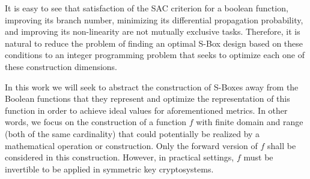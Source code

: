\documentclass[11pt]{article}
\begin{document}
It is easy to see that satisfaction of the SAC criterion for a boolean function, improving its branch number, minimizing its differential propagation probability, and improving its non-linearity are not mutually exclusive tasks. Therefore, it is natural to reduce the problem of finding an optimal S-Box design based on these conditions to an integer programming problem that seeks to optimize each one of these construction dimensions. 

In this work we will seek to abstract the construction of S-Boxes away from the Boolean functions that they represent and optimize the representation of this function in order to achieve ideal values for aforementioned metrics. In other words, we focus on the construction of a function $f$ with finite domain and range (both of the same cardinality) that could potentially be realized by a mathematical operation or construction. Only the forward version of $f$ shall be considered in this construction. However, in practical settings, $f$ must be invertible to be applied in symmetric key cryptosystems. 



\end{document}

